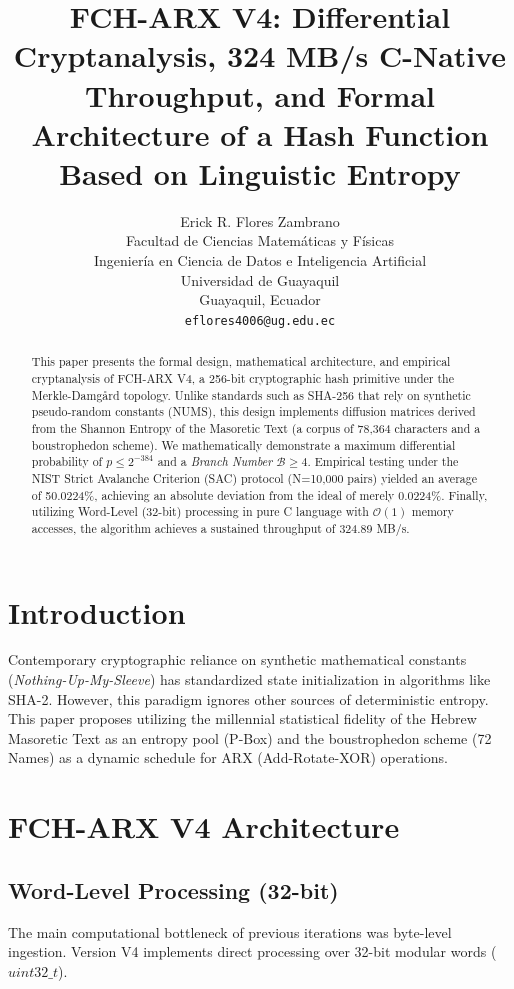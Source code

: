 \documentclass[10pt,twocolumn,letterpaper]{article}
\title{\LARGE \bf
FCH-ARX V4: Differential Cryptanalysis, 324 MB/s C-Native Throughput, and Formal Architecture of a Hash Function Based on Linguistic Entropy
}
\author{
Erick R. Flores Zambrano\\
Facultad de Ciencias Matemáticas y Físicas\\
Ingeniería en Ciencia de Datos e Inteligencia Artificial\\
Universidad de Guayaquil\\
Guayaquil, Ecuador\\
{\tt\small eflores4006@ug.edu.ec}
}
\begin{document}
\maketitle
\thispagestyle{empty}

\begin{abstract}
This paper presents the formal design, mathematical architecture, and empirical cryptanalysis of FCH-ARX V4, a 256-bit cryptographic hash primitive under the Merkle-Damgård topology. Unlike standards such as SHA-256 that rely on synthetic pseudo-random constants (NUMS), this design implements diffusion matrices derived from the Shannon Entropy of the Masoretic Text (a corpus of 78,364 characters and a boustrophedon scheme). We mathematically demonstrate a maximum differential probability of $p \leq 2^{-384}$ and a \textit{Branch Number} $\mathcal{B} \geq 4$. Empirical testing under the NIST Strict Avalanche Criterion (SAC) protocol (N=10,000 pairs) yielded an average of 50.0224\%, achieving an absolute deviation from the ideal of merely 0.0224\%. Finally, utilizing Word-Level (32-bit) processing in pure C language with $\mathcal{O}(1)$ memory accesses, the algorithm achieves a sustained throughput of 324.89 MB/s.
\end{abstract}

\section{Introduction}

Contemporary cryptographic reliance on synthetic mathematical constants (\textit{Nothing-Up-My-Sleeve}) has standardized state initialization in algorithms like SHA-2. However, this paradigm ignores other sources of deterministic entropy. This paper proposes utilizing the millennial statistical fidelity of the Hebrew Masoretic Text as an entropy pool (P-Box) and the boustrophedon scheme (72 Names) as a dynamic schedule for ARX (Add-Rotate-XOR) operations.

\section{FCH-ARX V4 Architecture}

\subsection{Word-Level Processing (32-bit)}
The main computational bottleneck of previous iterations was byte-level ingestion. Version V4 implements direct processing over 32-bit modular words ($uint32\_t$).
\end{document}
